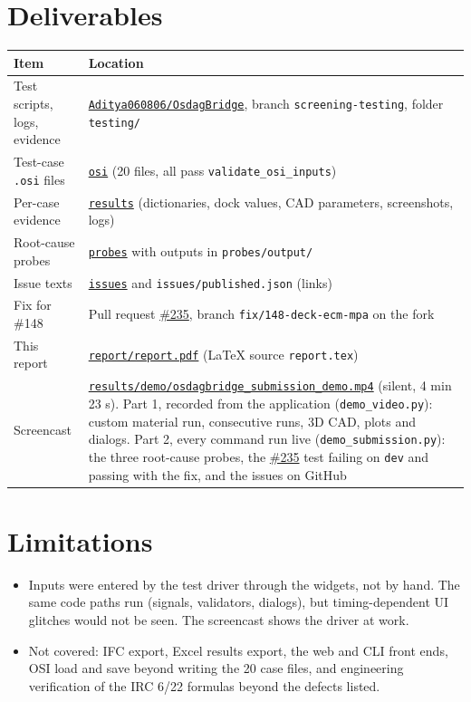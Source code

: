 \documentclass[11pt,a4paper]{article}
\newcommand{\issue}[1]{\href{https://github.com/Nidhikhare12/OsdagBridge/issues/#1}{\##1}}
\newcommand{\ev}[1]{\href{https://github.com/Aditya060806/OsdagBridge/tree/screening-testing/testing/#1}{\nolinkurl{#1}}}
\begin{document}
\section{Deliverables}
\begin{table}[htbp]
\small
\begin{tabularx}{\linewidth}{@{}lY@{}}
\toprule
\textbf{Item} & \textbf{Location} \\
\midrule
Test scripts, logs, evidence & \href{https://github.com/Aditya060806/OsdagBridge/tree/screening-testing/testing}{\nolinkurl{Aditya060806/OsdagBridge}}, branch \texttt{screening-testing}, folder \texttt{testing/} \\
Test-case \texttt{.osi} files & \ev{osi} (20 files, all pass \texttt{validate\_osi\_inputs}) \\
Per-case evidence & \ev{results} (dictionaries, dock values, CAD parameters, screenshots, logs) \\
Root-cause probes & \ev{probes} with outputs in \texttt{probes/output/} \\
Issue texts & \ev{issues} and \texttt{issues/published.json} (links) \\
Fix for \#148 & Pull request \issue{235}, branch \texttt{fix/148-deck-ecm-mpa} on the fork \\
This report & \ev{report/report.pdf} (LaTeX source \texttt{report.tex}) \\
Screencast & \ev{results/demo/osdagbridge_submission_demo.mp4} (silent, 4 min 23 s). Part 1, recorded from the application
(\texttt{demo\_video.py}): custom material run, consecutive runs, 3D CAD, plots and dialogs. Part 2, every command run live
(\texttt{demo\_submission.py}): the three root-cause probes, the \issue{235} test failing on \texttt{dev} and passing with the fix,
and the issues on GitHub \\
\bottomrule
\end{tabularx}
\end{table}

\section{Limitations}
\begin{itemize}
\item Inputs were entered by the test driver through the widgets, not by hand. The same code paths run (signals, validators,
  dialogs), but timing-dependent UI glitches would not be seen. The screencast shows the driver at work.
\item Not covered: IFC export, Excel results export, the web and CLI front ends, OSI load and save beyond writing the 20 case files,
  and engineering verification of the IRC 6/22 formulas beyond the defects listed.
\end{itemize}
\end{document}
